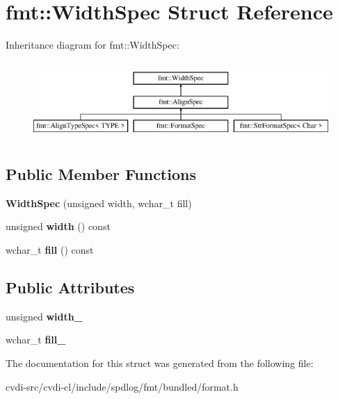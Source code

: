 \hypertarget{structfmt_1_1WidthSpec}{}\section{fmt\+:\+:Width\+Spec Struct Reference}
\label{structfmt_1_1WidthSpec}
Inheritance diagram for fmt\+:\+:Width\+Spec\+:\begin{figure}[H]
\begin{center}
\leavevmode
\includegraphics[height=3.000000cm]{structfmt_1_1WidthSpec}
\end{center}
\end{figure}
\subsection*{Public Member Functions}
\begin{DoxyCompactItemize}
\item 
{\bfseries Width\+Spec} (unsigned width, wchar\+\_\+t fill)\hypertarget{structfmt_1_1WidthSpec_a483e63eb1ac98bbdaacc701be5f3cc82}{}\label{structfmt_1_1WidthSpec_a483e63eb1ac98bbdaacc701be5f3cc82}

\item 
unsigned {\bfseries width} () const \hypertarget{structfmt_1_1WidthSpec_ad6624ee681712f695f133ba2e9d9ce36}{}\label{structfmt_1_1WidthSpec_ad6624ee681712f695f133ba2e9d9ce36}

\item 
wchar\+\_\+t {\bfseries fill} () const \hypertarget{structfmt_1_1WidthSpec_a28a9b78a0ebfd5830025eaf1c917bb16}{}\label{structfmt_1_1WidthSpec_a28a9b78a0ebfd5830025eaf1c917bb16}

\end{DoxyCompactItemize}
\subsection*{Public Attributes}
\begin{DoxyCompactItemize}
\item 
unsigned {\bfseries width\+\_\+}\hypertarget{structfmt_1_1WidthSpec_a83fed5d5a674ea54a48feb6edef4c1c7}{}\label{structfmt_1_1WidthSpec_a83fed5d5a674ea54a48feb6edef4c1c7}

\item 
wchar\+\_\+t {\bfseries fill\+\_\+}\hypertarget{structfmt_1_1WidthSpec_ad1c9740afb2b05c4ac7b2d9fa9760891}{}\label{structfmt_1_1WidthSpec_ad1c9740afb2b05c4ac7b2d9fa9760891}

\end{DoxyCompactItemize}


The documentation for this struct was generated from the following file\+:\begin{DoxyCompactItemize}
\item 
cvdi-\/src/cvdi-\/cl/include/spdlog/fmt/bundled/format.\+h\end{DoxyCompactItemize}
